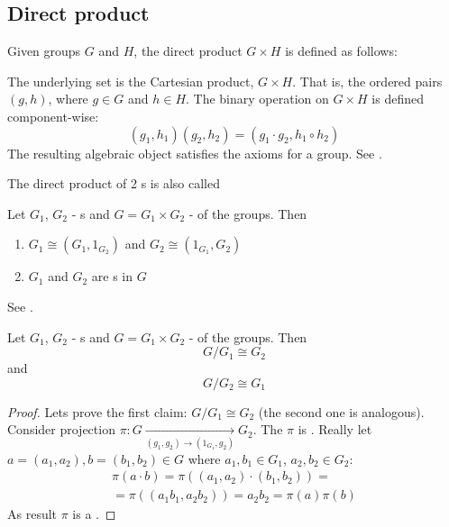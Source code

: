 \begin{appendices}
\subsection{Direct product}

\begin{definition}
  Given groups $G$ and $H$, the direct product $G \times H$ is defined as follows:

  The underlying set is the Cartesian product, $G \times H$. That is, the
  ordered pairs $\left(g,h\right)$, where $g \in G$ and $h \in H$. 
  The binary operation on $G \times H$ is defined component-wise:
  \[
  \left(g_1,h_1\right)\left(g_2,h_2\right) =
  \left(g_1 \cdot g_2, h_1 \circ h_2\right)
  \]
  The resulting algebraic object satisfies the axioms for a group.
  See \cite{wiki:directproduct}.

  The direct product of 2 s is also called
  
  \label{def:directproduct}
\end{definition}

\begin{property}
  Let $G_1$, $G_2$ - s and $G = G_1 \times G_2$ -
   of the groups. Then
  \begin{enumerate}
  \item $G_1 \cong \left(G_1, 1_{G_2}\right)$ and
    $G_2 \cong \left(1_{G_1}, G_2\right)$
  \item $G_1$ and $G_2$ are s in $G$
  \end{enumerate}
  See \cite{wiki:directproduct}.
  \label{property:directproduct}
\end{property}

\begin{property}
  Let $G_1$, $G_2$ - s and $G = G_1 \times G_2$ -
   of the groups.
  Then
  \[
  G/G_1 \cong G_2
  \]
  and
  \[
  G/G_2 \cong G_1
  \]
  \label{property:directproductquotient}
  \begin{proof}
    Lets prove the first claim:
    $G/G_1 \cong G_2$ (the second one is analogous).
    Consider projection
    $\pi: G \xrightarrow[(g_1, g_2) \to (1_{G_1}, g_2)]{} G_2$. The
    $\pi$ is . Really
    let $a = (a_1, a_2), b = (b_1, b_2) \in G$ where
    $a_{1}, b_1 \in G_1$, $a_2, b_{2} \in G_2$:
    \begin{eqnarray}
      \pi\left(a \cdot b\right) = \pi\left(
      (a_1, a_2) \cdot (b_1, b_2)
      \right) =
      \nonumber \\
      = \pi\left(
      (a_1 b_1, a_2 b_2)
      \right) = a_2 b_2 =
      \pi\left(a\right) \pi\left(b\right)
      \nonumber
    \end{eqnarray}
    As result $\pi$ is a .
    

\end{proof}
\end{property}
\end{appendices}
